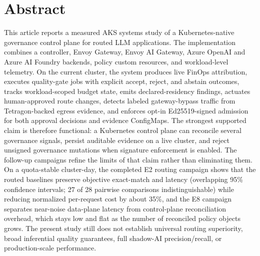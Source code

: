 \section*{Abstract}
This article reports a measured AKS systems study of a Kubernetes-native governance control plane for routed LLM applications. The implementation combines a controller, Envoy Gateway, Envoy AI Gateway, Azure OpenAI and Azure AI Foundry backends, policy custom resources, and workload-level telemetry. On the current cluster, the system produces live FinOps attribution, executes quality-gate jobs with explicit accept, reject, and abstain outcomes, tracks workload-scoped budget state, emits declared-residency findings, actuates human-approved route changes, detects labeled gateway-bypass traffic from Tetragon-backed egress evidence, and enforces opt-in Ed25519-signed admission for both approval decisions and evidence ConfigMaps. The strongest supported claim is therefore functional: a Kubernetes control plane can reconcile several governance signals, persist auditable evidence on a live cluster, and reject unsigned governance mutations when signature enforcement is enabled. The follow-up campaigns refine the limits of that claim rather than eliminating them. On a quota-stable cluster-day, the completed E2 routing campaign shows that the routed baselines preserve objective exact-match and latency (overlapping 95\% confidence intervals; 27 of 28 pairwise comparisons indistinguishable) while reducing normalized per-request cost by about 35\%, and the E8 campaign separates near-noise data-plane latency from control-plane reconciliation overhead, which stays low and flat as the number of reconciled policy objects grows. The present study still does not establish universal routing superiority, broad inferential quality guarantees, full shadow-AI precision/recall, or production-scale performance.
